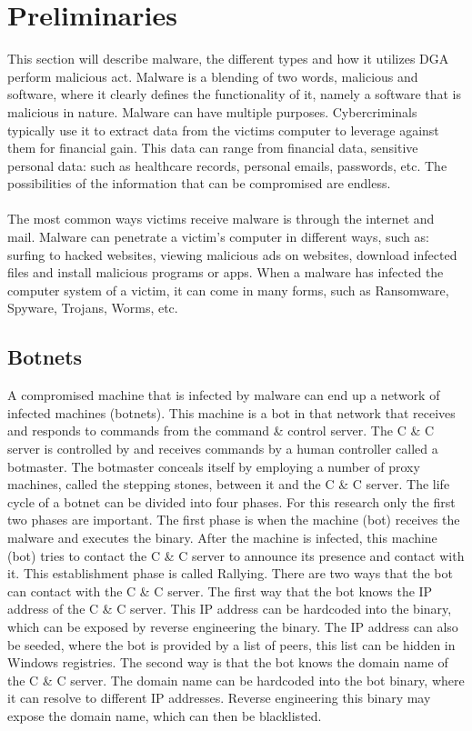 \chapter{Preliminaries}\label{preliminaries}
This section will describe malware, the different types and how it utilizes DGA
perform malicious act. Malware is a blending of two words, malicious and
software, where it clearly defines the functionality of it, namely a software
that is malicious in nature. Malware can have multiple purposes. Cybercriminals
typically use it to extract data from the victims computer to leverage against
them for financial gain. This data can range from financial data, sensitive
personal data: such as healthcare records, personal emails, passwords, etc. The
possibilities of the information that can be compromised are endless.\\\\ The
most common ways victims receive malware is through the internet and mail.
Malware can penetrate a victim's computer in different ways, such as: surfing to
hacked websites, viewing malicious ads on websites, download infected files and
install malicious programs or apps. When a malware has infected the computer
system of a victim, it can come in many forms, such as Ransomware, Spyware,
Trojans, Worms, etc.
\section{Botnets}
A compromised machine that is infected
by malware can end up a network of infected machines (botnets). This machine is
a bot in that network that receives and responds to commands from the command \&
control server. The C \& C server is controlled by and receives commands by a
human controller called a botmaster. The botmaster conceals itself by employing
a number of proxy machines, called the stepping stones, between it and the C \&
C server.  
\pagebreak 
The life cycle of a botnet can be divided into four
phases. For this research only the first two phases are important. The first
phase is when the machine (bot) receives the malware and executes the binary.
After the machine is infected, this machine (bot) tries to contact the C \& C
server to announce its presence and contact with it. This establishment phase is
called Rallying. There are two ways that the bot can contact with the C \& C
server. The first way that the bot knows the IP address of the C \& C server.
This IP address can be hardcoded into the binary, which can be exposed 
by reverse engineering the binary. The IP address can also be seeded,
where the bot is provided by a list of peers, this list can be hidden in Windows
registries.  The second way is that the bot knows the domain name of the C \& C
server.  The domain name can be hardcoded into the bot binary, where it can
resolve to different IP addresses.  Reverse engineering this binary may expose
the domain name, which can then be blacklisted.
